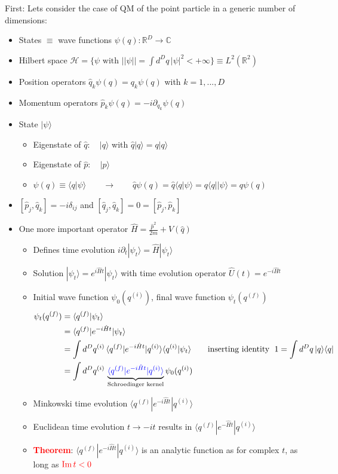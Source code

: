 \documentclass[10pt,a4paper]{article}
\theoremstyle{definition}
\begin{document}
First: Lets consider the case of QM of the point particle in a generic number of dimensions:
\begin{itemize}
\item States $\equiv$ wave functions $\psi(q):\mathbb{R}^D\rightarrow\mathbb{C}$
\item Hilbert space $\mathcal{H}=\{\psi \text{ with } ||\psi||=\int d^Dq\,|\psi|^2<+\infty\}\equiv L^2(\mathbb{R}^2)$
\item Position operators $\hat{q}_k\psi(q)=q_k\psi(q)$ with $k=1,...,D$
\item Momentum operators $\hat{p}_k\psi(q)=-i\partial_{q_k}\psi(q)$
\item State $|\psi\rangle$
\begin{itemize}
\item Eigenstate of $\hat{q}:\quad|q\rangle$ with $\hat{q}|q\rangle=q|q\rangle$
\item Eigenstate of $\hat{p}:\quad|p\rangle$
\item $\psi(q)\equiv\langle q|\psi\rangle\qquad\rightarrow\qquad\hat{q}\psi(q)=\hat{q}\langle q|\psi\rangle=q\langle q||\psi\rangle=q\psi(q)$
\end{itemize}
\item $[\hat{p}_j,\hat{q}_k]=-i\delta_{ij}$ and  $[\hat{q}_j,\hat{q}_k]=0=[\hat{p}_j,\hat{p}_k]$
\item One more important operator  $\hat{H}=\frac{\hat{p}^2}{2m}+V(\hat{q})$
\begin{itemize}
\item Defines time evolution $i\partial_t|\psi_t\rangle=\hat{H}|\psi_t\rangle$
\item Solution $|\psi_t\rangle=e^{i\hat{H}t}|\psi_t\rangle$ with time evolution operator $\hat{U}(t)=e^{-i\hat{H}t}$
\item Initial wave function $\psi_0(q^{(i)})$, final wave function $\psi_t(q^{(f)})$
\begin{align}
\psi_t(q^{(f)})
&=\langle q^{(f)}|\psi_t\rangle\\
&=\langle q^{(f)}|e^{-i\hat{H}t}|\psi_t\rangle\\
&=\int d^Dq^{(i)}\,\langle q^{(f)}|e^{-i\hat{H}t}|q^{(i)}\rangle\langle q^{(i)}|\psi_t\rangle\qquad\text{inserting identity } \;1=\int d^Dq\,|q\rangle\langle q|\\
&=\int d^Dq^{(i)}\,\underbrace{\textcolor{blue}{\langle q^{(f)}|e^{-i\hat{H}t}|q^{(i)}\rangle}}_{\text{Schroedinger kernel}}\psi_0(q^{(i)})
\end{align}
\item Minkowski time evolution $\langle q^{(f)}|e^{-i\hat{H}t}|q^{(i)}\rangle$
\item Euclidean time evolution $t \rightarrow -it$ results in $\langle q^{(f)}|e^{-\hat{H}t}|q^{(i)}\rangle$
\item \textcolor{red}{\bf Theorem}: $\langle q^{(f)}|e^{-i\hat{H}t}|q^{(i)}\rangle$ is an analytic function as for complex $t$, as long as $\textcolor{red}{\text{Im}\,t<0}$ 


\end{itemize}
\end{itemize}
\end{document}

